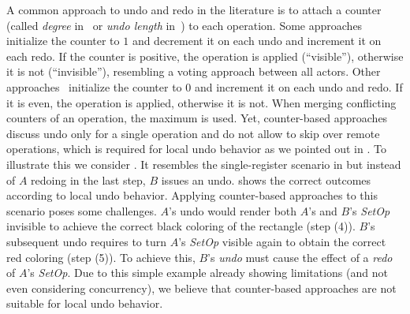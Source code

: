 \documentclass[sigplan,natbib=false,review]{acmart}
\newcommand{\setopkind}{\textit{SetOp}}
\begin{document}
A common approach to undo and redo in the literature is to attach a counter
(called \emph{degree} in~\cite{Weiss2010LogootUndo} or
\emph{undo length} in~\cite{Brattli2021undo,Yu2019undo}) to each operation.
Some approaches~\cite{Weiss2010LogootUndo,Martin2010xml} initialize the
counter to $1$ and decrement it on each undo and increment it on each redo.
If the counter is positive, the operation is applied (``visible''),
otherwise it is not (``invisible''),
resembling a voting approach between all actors.
Other approaches~\cite{Brattli2021undo,Yu2019undo} initialize the counter
to $0$ and increment it on each undo and redo.
If it is even, the operation is applied, otherwise it is not.
When merging conflicting counters of an operation, the maximum is used.
Yet, counter-based approaches discuss undo only for a single operation
and do not allow to skip over remote operations, which is required
for local undo behavior as we pointed out in .
To illustrate this we consider .
It resembles the single-register scenario in  but
instead of $A$ redoing in the last step, $B$ issues an undo.
 shows the correct outcomes according to local undo
behavior.
Applying counter-based approaches to this scenario poses some challenges.
$A$'s undo would render both $A$'s and $B$'s \setopkind{} invisible to
achieve the correct black coloring of the rectangle (step (4)).
$B$'s subsequent undo requires to turn $A$'s \setopkind{} visible again to
obtain the correct red coloring (step (5)).
To achieve this, $B$'s \emph{undo} must cause the effect of a \emph{redo}
of $A$'s \setopkind{}.
Due to this simple example already showing limitations (and not even considering
concurrency), we believe that counter-based approaches are not suitable
for local undo behavior.

\end{document}
